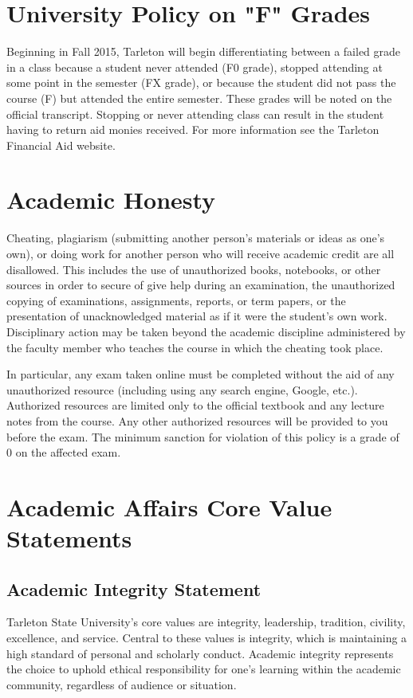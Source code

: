 \documentclass[10pt]{article}
\begin{document}
\section*{University Policy on "F" Grades}
\label{sec-7}

Beginning in Fall 2015, Tarleton will begin differentiating between a failed grade in a class because a student never attended (F0 grade), stopped attending at some point in the semester (FX grade), or because the student did not pass the course (F) but attended the entire semester. These grades will be noted on the official transcript. Stopping or never attending class can result in the student having to return aid monies received.  For more information see the Tarleton Financial Aid website.

\section*{Academic Honesty}
\label{sec-8}

Cheating, plagiarism (submitting another person’s materials or ideas as one’s own), or doing work for another person who will receive academic credit are all disallowed. This includes the use of unauthorized books, notebooks, or other sources in order to secure of give help during an examination, the unauthorized copying of examinations, assignments, reports, or term papers, or the presentation of unacknowledged material as if it were the student’s own work. Disciplinary action may be taken beyond the academic discipline administered by the faculty member who teaches the course in which the cheating took place.

In particular, any exam taken online must be completed without the aid of any unauthorized resource (including using any search engine, Google, etc.).  Authorized resources are limited only to the official textbook and any lecture notes from the course.  Any other authorized resources will be provided to you before the exam.  The minimum sanction for violation of this policy is a grade of 0 on the affected exam.

\section*{Academic Affairs Core Value Statements}
\label{sec-9}

\subsection*{Academic Integrity Statement}
\label{sec-9-1}
Tarleton State University's core values are integrity, leadership, tradition, civility, excellence, and service.  Central to these values is integrity, which is maintaining a high standard of personal and scholarly conduct.  Academic integrity represents the choice to uphold ethical responsibility for one’s learning within the academic community, regardless of audience or situation.
\end{document}

